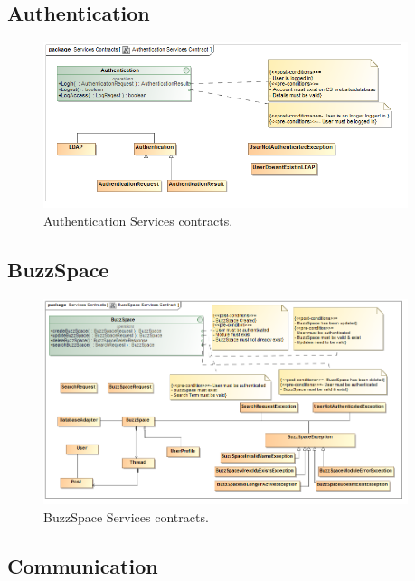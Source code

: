 \documentclass [a4paper,12pt] {article}
\begin{document}
		\subsection*{Authentication}
			\begin{figure}[h!]
						\centering
						\includegraphics[width=0.95\textwidth]{AuthenticationSC.png}
						\caption{Authentication Services contracts.}
			\end{figure}
		\subsection*{BuzzSpace}
					\begin{figure}[h!]
						\centering
						\includegraphics[width=0.95\textwidth]{BuzzSpaceSC.png}
						\caption{BuzzSpace Services contracts.}
					\end{figure}
		\subsection*{Communication}
\end{document}

